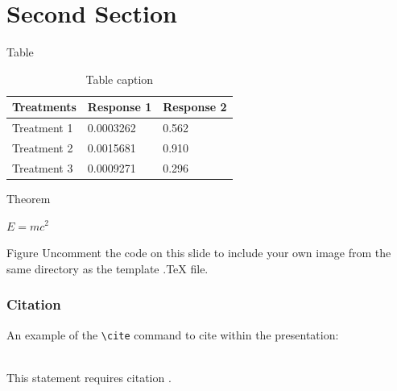 \documentclass[aspectratio=169,xcolor=dvipsnames]{beamer}
\begin{document}
\section{Second Section}

\begin{frame}{Table}
    \begin{table}
        \begin{tabular}{l l l}
            \toprule
            \textbf{Treatments} & \textbf{Response 1} & \textbf{Response 2} \\
            \midrule
            Treatment 1         & 0.0003262           & 0.562               \\
            Treatment 2         & 0.0015681           & 0.910               \\
            Treatment 3         & 0.0009271           & 0.296               \\
            \bottomrule
        \end{tabular}
        \caption{Table caption}
    \end{table}
\end{frame}


\begin{frame}{Theorem}
    \begin{theorem}
        $E = mc^2$
    \end{theorem}
\end{frame}


\begin{frame}{Figure}
    Uncomment the code on this slide to include your own image from the same directory as the template .TeX file.
\end{frame}


\begin{frame}[fragile] %
    \frametitle{Citation}
    An example of the \verb|\cite| command to cite within the presentation:\\~

    This statement requires citation \cite{p1}.
\end{frame}
\end{document}
